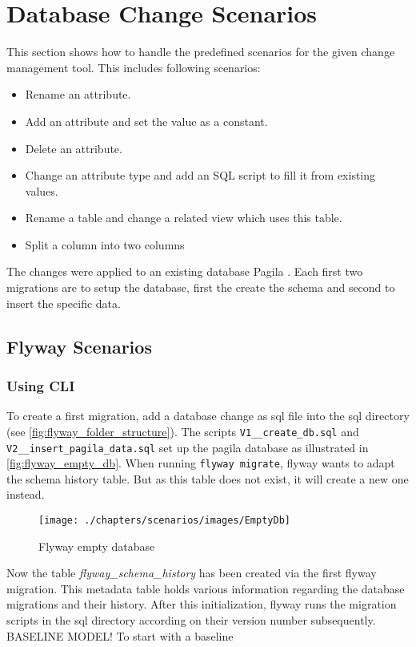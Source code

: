

\chapter{Database Change Scenarios}
This section shows how to handle the predefined scenarios for the given change management tool. This includes following scenarios: 

\begin{itemize}
	\item Rename an attribute.
	\item Add an attribute and set the value as a constant.
	\item Delete an attribute.
	\item Change an attribute type and add an SQL script to fill it from existing values.
	\item Rename a table and change a related view which uses this table.
	\item Split a column into two columns
\end{itemize}

The changes were applied to an existing database Pagila \cite{Hillyer}. Each first two migrations are to setup the database, first the create the schema and second to insert the specific data.

\section{Flyway Scenarios}

\subsection{Using CLI}
%
To create a first migration, add a database change as sql file into the sql directory (see \autoref{fig:flyway_folder_structure}). 
The scripts \texttt{V1\_\_create\_db.sql} and \texttt{V2\_\_insert\_pagila\_data.sql} set up the pagila database as illustrated in \autoref{fig:flyway_empty_db}. When running  \texttt{flyway migrate}, flyway wants to adapt the schema history table. But as this table does not exist, it will create a new one instead.


 

\begin{figure}[H]
	\centering
	\texttt{[image: ./chapters/scenarios/images/EmptyDb]}
	\caption[Flyway empty database - Source: \cite{FlywayGetStarted}]{Flyway empty database}
	 \label{fig:flyway_empty_db}
\end{figure}
Now the table \textit{flyway\_schema\_history} has been created via the first flyway migration. This metadata table holds various information regarding the database migrations and their history. After this initialization, flyway runs the migration scripts in the sql directory according on their version number subsequently. 
BASELINE MODEL! To start with a baseline

